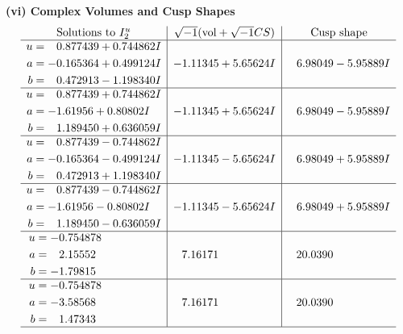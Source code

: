 \documentclass[1p]{elsarticle_modified}
\theoremstyle{definition}
\newcommand{\I}{\sqrt{-1}}
\begin{document}
\newpage\flushleft \textbf{(vi) Complex Volumes and Cusp Shapes}
$$\begin{array}{c|c|c}  
\text{Solutions to }I^u_{2}& \I (\text{vol} + \sqrt{-1}CS) & \text{Cusp shape}\\
 \hline 
\begin{aligned}
u &= \phantom{-}0.877439 + 0.744862 I \\
a &= -0.165364 + 0.499124 I \\
b &= \phantom{-}0.472913 - 1.198340 I\end{aligned}
 & -1.11345 + 5.65624 I & \phantom{-}6.98049 - 5.95889 I \\ \hline\begin{aligned}
u &= \phantom{-}0.877439 + 0.744862 I \\
a &= -1.61956 + 0.80802 I \\
b &= \phantom{-}1.189450 + 0.636059 I\end{aligned}
 & -1.11345 + 5.65624 I & \phantom{-}6.98049 - 5.95889 I \\ \hline\begin{aligned}
u &= \phantom{-}0.877439 - 0.744862 I \\
a &= -0.165364 - 0.499124 I \\
b &= \phantom{-}0.472913 + 1.198340 I\end{aligned}
 & -1.11345 - 5.65624 I & \phantom{-}6.98049 + 5.95889 I \\ \hline\begin{aligned}
u &= \phantom{-}0.877439 - 0.744862 I \\
a &= -1.61956 - 0.80802 I \\
b &= \phantom{-}1.189450 - 0.636059 I\end{aligned}
 & -1.11345 - 5.65624 I & \phantom{-}6.98049 + 5.95889 I \\ \hline\begin{aligned}
u &= -0.754878\phantom{ +0.000000I} \\
a &= \phantom{-}2.15552\phantom{ +0.000000I} \\
b &= -1.79815\phantom{ +0.000000I}\end{aligned}
 & \phantom{-}7.16171\phantom{ +0.000000I} & \phantom{-}20.0390\phantom{ +0.000000I} \\ \hline\begin{aligned}
u &= -0.754878\phantom{ +0.000000I} \\
a &= -3.58568\phantom{ +0.000000I} \\
b &= \phantom{-}1.47343\phantom{ +0.000000I}\end{aligned}
 & \phantom{-}7.16171\phantom{ +0.000000I} & \phantom{-}20.0390\phantom{ +0.000000I}\\
 \hline 
 \end{array}$$\newpage\newpage\renewcommand{\arraystretch}{1}
\end{document}
